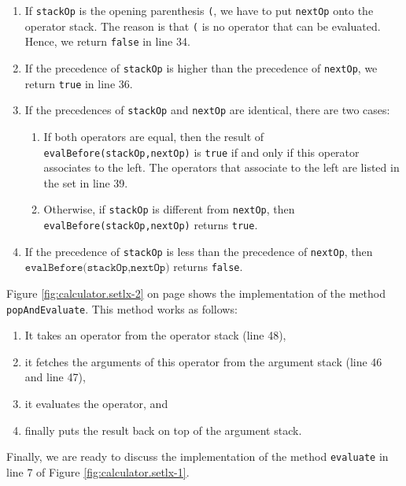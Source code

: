 \begin{enumerate}
\item If \texttt{stackOp} is the opening parenthesis \texttt{(}, we have to put
      \texttt{nextOp} onto the operator stack.  The reason is that \texttt{(}
      is no operator that can be evaluated.  Hence, we return \texttt{false} in line 34.
\item If the precedence of \texttt{stackOp} is higher than the precedence of \texttt{nextOp}, we
      return \texttt{true} in line 36.
\item If the precedences of \texttt{stackOp} and \texttt{nextOp} are identical, there are two cases:
      \begin{enumerate}
      \item If both operators are equal, then the result of
            \texttt{evalBefore(stackOp,nextOp)} is \texttt{true} if and only if
            this operator associates to the left.  The operators that associate to the left are
            listed in the set in line 39.
      \item Otherwise, if \texttt{stackOp} is different from \texttt{nextOp}, then \\
            \texttt{evalBefore(stackOp,nextOp)} returns \texttt{true}. 
      \end{enumerate}
\item If the precedence of \texttt{stackOp} is less than the precedence of \texttt{nextOp}, then 
      $\texttt{evalBefore(stackOp,nextOp})$ returns \texttt{false}.
\end{enumerate}
Figure  \ref{fig:calculator.setlx-2} on page \pageref{fig:calculator.setlx-2} shows the
implementation of the method \texttt{popAndEvaluate}.
This method works as follows: 
\begin{enumerate}
\item It takes an operator from the operator stack (line 48), 
\item it fetches the arguments of this operator from the argument stack (line 46 and line 47),
\item it evaluates the operator,  and
\item finally puts the result back on top of the argument stack.
\end{enumerate}
Finally, we are ready to discuss the implementation of the method \texttt{evaluate} in line 7 of
Figure \ref{fig:calculator.setlx-1}.  

